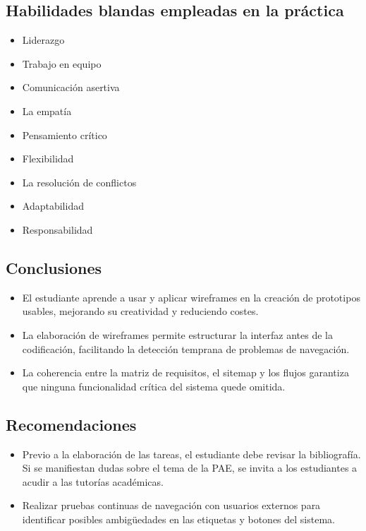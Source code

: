 \documentclass{article}
\begin{document}
\subsection{Habilidades blandas empleadas en la práctica}
\begin{itemize}[leftmargin=1.5em, itemsep=2pt]
    \item[$\blacksquare$] Liderazgo
    \item[$\blacksquare$] Trabajo en equipo
    \item[$\square$] Comunicación asertiva
    \item[$\square$] La empatía
    \item[$\square$] Pensamiento crítico
    \item[$\square$] Flexibilidad
    \item[$\square$] La resolución de conflictos
    \item[$\square$] Adaptabilidad
    \item[$\blacksquare$] Responsabilidad
\end{itemize}

\subsection{Conclusiones}
\begin{itemize}[leftmargin=1.5em, itemsep=4pt]
    \item El estudiante aprende a usar y aplicar wireframes en la creación de prototipos usables, mejorando su creatividad y reduciendo costes.
    \item La elaboración de wireframes permite estructurar la interfaz antes de la codificación, facilitando la detección temprana de problemas de navegación.
    \item La coherencia entre la matriz de requisitos, el sitemap y los flujos garantiza que ninguna funcionalidad crítica del sistema quede omitida.
\end{itemize}

\subsection{Recomendaciones}
\begin{itemize}[leftmargin=1.5em, itemsep=4pt]
    \item Previo a la elaboración de las tareas, el estudiante debe revisar la bibliografía. Si se manifiestan dudas sobre el tema de la PAE, se invita a los estudiantes a acudir a las tutorías académicas.
    \item Realizar pruebas continuas de navegación con usuarios externos para identificar posibles ambigüedades en las etiquetas y botones del sistema.
\end{itemize}
\end{document}
